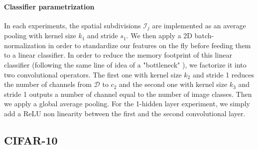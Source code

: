 \documentclass{article} %
\begin{document}
\paragraph{Classifier parametrization} In each experiments, the spatial subdivisions $\mathcal{I}_j$ are implemented as an average pooling with kernel size $k_1$ and stride $s_1$.
We then apply a 2D batch-normalization \citep{ioffe2015batch} in order to standardize our features on the fly before feeding them to a linear classifier.
In order to reduce the memory footprint of this linear classifier (following the same line of idea of a "bottleneck" \citep{he2016deep}), we factorize it into two convolutional operators.
The first one with kernel size $k_2$ and stride 1 reduces the number of channels from $\mathcal{D}$ to $c_2$ and the second one with kernel size $k_3$ and stride 1 outputs a number of channel equal to the number of image classes.
Then we apply a global average pooling.
For the 1-hidden layer experiment, we simply add a ReLU non linearity between the first and the second convolutional layer.




\subsection{CIFAR-10}
\end{document}
